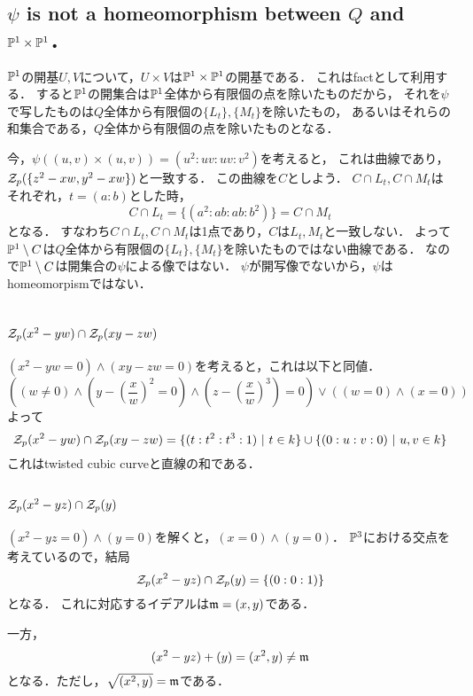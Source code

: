 \documentclass[a4paper]{jsarticle}
\begin{document}
    \subsection{$\psi$ is not a homeomorphism between $Q$ and $\mathbb{P}^1 \times \mathbb{P}^1$．}
    $\mathbb{P}^1$の開基$U,V$について，$U \times V$は$\mathbb{P}^1 \times \mathbb{P}^1$の開基である．
    これはfactとして利用する．
    すると$\mathbb{P}^1$の開集合は$\mathbb{P}^1$全体から有限個の点を除いたものだから，
    それを$\psi$で写したものは$Q$全体から有限個の$\{L_t\}, \{M_t\}$を除いたもの，
    あるいはそれらの和集合である，$Q$全体から有限個の点を除いたものとなる．

    今，$\psi((u,v) \times (u,v))=(u^2:uv:uv:v^2)$を考えると，
    これは曲線であり，$\mathcal{Z}_p(\{z^2-xw, y^2-xw\})$と一致する．
    この曲線を$C$としよう．
    $C \cap L_t, C \cap M_t$はそれぞれ，$t=(a:b)$とした時，
    \[ C \cap L_t=\{(a^2:ab:ab:b^2)\}=C \cap M_t \]
    となる．
    すなわち$C \cap L_t, C \cap M_t$は1点であり，$C$は$L_t, M_t$と一致しない．
    よって$\mathbb{P}^1 \setminus C$は$Q$全体から有限個の$\{L_t\}, \{M_t\}$を除いたものではない曲線である．
    なので$\mathbb{P}^1 \setminus C$は開集合の$\psi$による像ではない．
    $\psi$が開写像でないから，$\psi$はhomeomorpismではない．

\section{ } %
    \subsection{$\mathcal{Z}_p(x^2-yw) \cap \mathcal{Z}_p(xy-zw)$}
    $(x^2-yw=0) \land (xy-zw=0)$を考えると，これは以下と同値．
    \[ ((w \neq 0) \land (y-(\frac{x}{w})^2=0) \land (z-(\frac{x}{w})^3)=0) \lor ((w=0) \land (x=0)) \]
    よって
    \[
        \mathcal{Z}_p(x^2-yw) \cap \mathcal{Z}_p(xy-zw)
        =\{(t: t^2: t^3: 1) ~|~ t \in k\} \cup \{ (0:u:v:0) ~|~ u,v \in k\}
    \]
    これはtwisted cubic curveと直線の和である．

    \subsection{$\mathcal{Z}_p(x^2-yz) \cap \mathcal{Z}_p(y)$}
    $(x^2-yz=0) \land (y=0)$を解くと，$(x=0) \land (y=0)$．
    $\mathbb{P}^3$における交点を考えているので，結局
    \[ \mathcal{Z}_p(x^2-yz) \cap \mathcal{Z}_p(y)=\{(0:0:1)\} \]となる．
    これに対応するイデアルは$\mathfrak{m}=(x,y)$である．

    一方，
    \[ (x^2-yz)+(y)=(x^2, y) \neq \mathfrak{m} \]
    となる．ただし，$\sqrt{(x^2, y)}=\mathfrak{m}$である．
\end{document}
